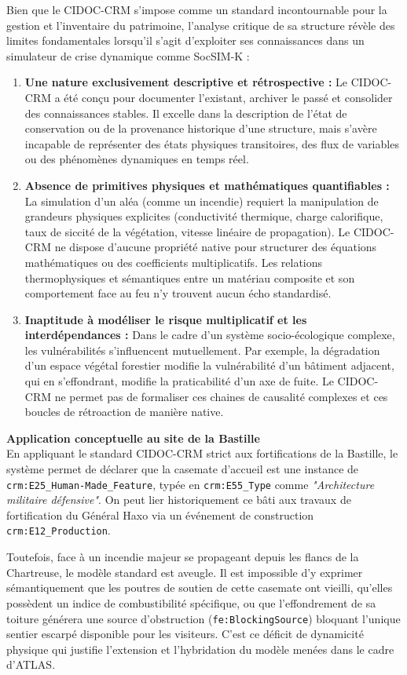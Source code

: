 \documentclass{article}
\begin{document}
Bien que le CIDOC-CRM s'impose comme un standard incontournable pour la gestion et l'inventaire du patrimoine, l'analyse critique de sa structure révèle des limites fondamentales lorsqu'il s'agit d'exploiter ses connaissances dans un simulateur de crise dynamique comme SocSIM-K :

\begin{enumerate}
    \item \textbf{Une nature exclusivement descriptive et rétrospective :} Le CIDOC-CRM a été conçu pour documenter l'existant, archiver le passé et consolider des connaissances stables. Il excelle dans la description de l'état de conservation ou de la provenance historique d'une structure, mais s'avère incapable de représenter des états physiques transitoires, des flux de variables ou des phénomènes dynamiques en temps réel.
    \item \textbf{Absence de primitives physiques et mathématiques quantifiables :} La simulation d'un aléa (comme un incendie) requiert la manipulation de grandeurs physiques explicites (conductivité thermique, charge calorifique, taux de siccité de la végétation, vitesse linéaire de propagation). Le CIDOC-CRM ne dispose d'aucune propriété native pour structurer des équations mathématiques ou des coefficients multiplicatifs. Les relations thermophysiques et sémantiques entre un matériau composite et son comportement face au feu n'y trouvent aucun écho standardisé.
    \item \textbf{Inaptitude à modéliser le risque multiplicatif et les interdépendances : } Dans le cadre d'un système socio-écologique complexe, les vulnérabilités s'influencent mutuellement. Par exemple, la dégradation d'un espace végétal forestier modifie la vulnérabilité d'un bâtiment adjacent, qui en s'effondrant, modifie la praticabilité d'un axe de fuite. Le CIDOC-CRM ne permet pas de formaliser ces chaines de causalité complexes et ces boucles de rétroaction de manière native.
\end{enumerate}

\begin{filrouge}
\textbf{Application conceptuelle au site de la Bastille} \\
En appliquant le standard CIDOC-CRM strict aux fortifications de la Bastille, le système permet de déclarer que la casemate d'accueil est une instance de \texttt{crm:E25\_Human-Made\_Feature}, typée en \texttt{crm:E55\_Type} comme \textit{"Architecture militaire défensive"}. On peut lier historiquement ce bâti aux travaux de fortification du Général Haxo via un événement de construction \texttt{crm:E12\_Production}. 

Toutefois, face à un incendie majeur se propageant depuis les flancs de la Chartreuse, le modèle standard est aveugle. Il est impossible d'y exprimer sémantiquement que les poutres de soutien de cette casemate ont vieilli, qu'elles possèdent un indice de combustibilité spécifique, ou que l'effondrement de sa toiture générera une source d'obstruction (\texttt{fe:BlockingSource}) bloquant l'unique sentier escarpé disponible pour les visiteurs. C'est ce déficit de dynamicité physique qui justifie l'extension et l'hybridation du modèle menées dans le cadre d'ATLAS.
\end{filrouge}
\end{document}
